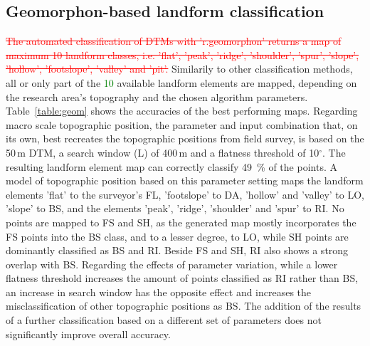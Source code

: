 \documentclass[preprint,12pt,authoryear]{elsarticle}
\begin{document}
\subsection{Geomorphon-based landform classification}
\textcolor{red}{\sout{The automated classification of DTMs with 'r.geomorphon' returns a map of maximum 10 landform classes, i.e. 'flat', 'peak', 'ridge', 'shoulder', 'spur', 'slope', 'hollow', 'footslope', 'valley' and 'pit'.}} Similarily to other classification methods, all or only part of the \textcolor{green} {10} available  landform elements are mapped, depending on the research area's topography and the chosen algorithm parameters. Table~\ref{table:geom} shows the accuracies of the best performing maps.
Regarding macro scale topographic position, the parameter and input combination that, on its own, best recreates the topographic positions from field survey, is based on the 50\,m DTM, a search window (L) of 400\,m and a flatness threshold of 10$^{\circ}$. The resulting landform element map can correctly classify 49~\% of the points. A model of topographic position based on this parameter setting maps the landform elements 'flat' to the surveyor's FL, 'footslope' to DA,  'hollow' and 'valley' to LO, 'slope' to BS, and the elements 'peak', 'ridge', 'shoulder' and 'spur' to RI. No points are mapped to FS and SH, as the generated map mostly incorporates the FS points into the BS class, and to a lesser degree, to LO, while SH points are dominantly classified as BS and RI. Beside FS  and SH, RI also shows a strong overlap with BS. Regarding the effects of parameter variation, while a lower flatness threshold increases the amount of points classified as RI rather than BS, an increase in search window has the opposite effect and increases the misclassification of other topographic positions as BS. The addition of the results of a further classification based on a different set of parameters does not significantly improve overall accuracy.
\end{document}
